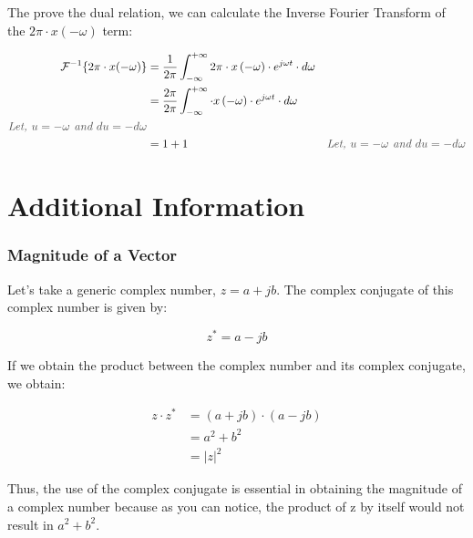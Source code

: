 \documentclass[letterpaper,12pt]{article}
\newcommand{\annot}[1]{\textcolor{darkgray}{\textit{#1}}}
\begin{document}
The prove the dual relation, we can calculate the Inverse Fourier Transform of the $2\pi\cdot x(-\omega)$ term:

\begin{equation*}
    \begin{aligned}
        \mathcal{F}^{-1}\{2\pi\cdot x(-\omega)\} & = \frac{1}{2\pi}\int_{-\infty}^{+\infty}2\pi\cdot x\left(-\omega\right)\cdot e^{j\omega t}\cdot d\omega                                                \\
                                                 & = \frac{2\pi}{2\pi}\int_{-\infty}^{+\infty}\cdot x\left(-\omega\right)\cdot e^{j\omega t}\cdot d\omega                                                 \\
        \annot{Let, $u = -\omega$ and $du=-d\omega$}                                                                                                                                                      \\
                                                 & = 1+ 1                                                                                                  & \annot{Let, $u = -\omega$ and $du=-d\omega$}
    \end{aligned}
\end{equation*}

\newpage
\section*{Additional Information}
\subsubsection*{Magnitude of a Vector}\label{sec:magnitude_vector}

Let's take a generic complex number, $z = a + jb$. The complex conjugate of this complex number is given by:

\[z^{*} = a - jb\]

If we obtain the product between the complex number and its complex conjugate, we obtain:

\begin{align*}
    z\cdot z^{*} & = (a + jb)\cdot (a - jb) \\
                 & = a^2 + b^2              \\
                 & = |z|^2
    \label{eq:complex_conjugate}
\end{align*}

Thus, the use of the complex conjugate is essential in obtaining the magnitude of a complex number because as you can notice, the product of z by itself would not result in $a^2 + b^2$.
\end{document}
